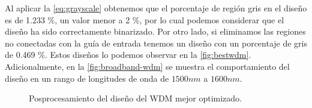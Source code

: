 Al aplicar la \autoref{eq:grayscale} obtenemos que el porcentaje de región gris en el diseño
es de 1.233 \%, un valor menor a 2 \%, por lo cual podemos considerar que el diseño ha sido
correctamente binarizado. Por otro lado, si eliminamos las regiones no conectadas con la guía de entrada
tenemos un diseño con un porcentaje de gris de 0.469 \%.
Estos diseños lo podemos observar en la \autoref{fig:bestwdm}.
Adicionalmente, en la \autoref{fig:broadband-wdm} se muestra el comportamiento del diseño
en un rango de longitudes de onda de $1500nm$ a $1600 nm$.

\begin{figure}[ht]
  \centering

  \hfill

  \hfill

  \caption{Posprocesamiento del diseño del WDM mejor optimizado.}
  \label{fig:bestwdm}

\end{figure}

